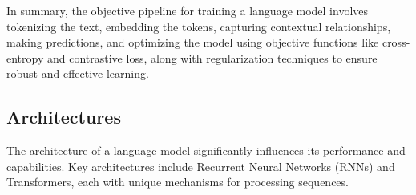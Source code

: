In summary, the objective pipeline for training a language model involves tokenizing the text, embedding the tokens, capturing contextual relationships, making predictions, and optimizing the model using objective functions like cross-entropy and contrastive loss, along with regularization techniques to ensure robust and effective learning.


\subsection{Architectures}

The architecture of a language model significantly influences its performance and capabilities. Key architectures include Recurrent Neural Networks (RNNs) and Transformers, each with unique mechanisms for processing sequences.

